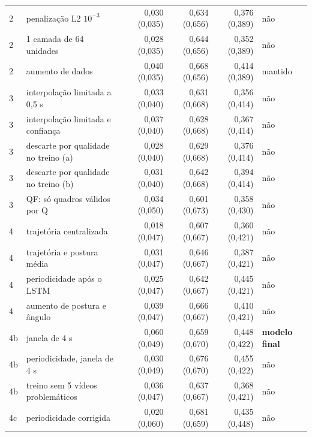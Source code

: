 \begin{table}[htbp]
\begin{tabular}{llrrrl}
2 & penalização L2 $10^{-3}$ & 0,030 (0,035) & 0,634 (0,656) & 0,376 (0,389) & não \\
2 & 1 camada de 64 unidades & 0,028 (0,035) & 0,644 (0,656) & 0,352 (0,389) & não \\
2 & aumento de dados & 0,040 (0,035) & 0,668 (0,656) & 0,414 (0,389) & mantido \\
\midrule
3 & interpolação limitada a 0,5 s & 0,033 (0,040) & 0,631 (0,668) & 0,356 (0,414) & não \\
3 & interpolação limitada e confiança & 0,037 (0,040) & 0,628 (0,668) & 0,367 (0,414) & não \\
3 & descarte por qualidade no treino (a) & 0,028 (0,040) & 0,629 (0,668) & 0,376 (0,414) & não \\
3 & descarte por qualidade no treino (b) & 0,031 (0,040) & 0,642 (0,668) & 0,394 (0,414) & não \\
3 & QF: só quadros válidos por Q & 0,034 (0,050) & 0,601 (0,673) & 0,358 (0,430) & não \\
\midrule
4 & trajetória centralizada & 0,018 (0,047) & 0,607 (0,667) & 0,360 (0,421) & não \\
4 & trajetória e postura média & 0,031 (0,047) & 0,646 (0,667) & 0,387 (0,421) & não \\
4 & periodicidade após o LSTM & 0,025 (0,047) & 0,642 (0,667) & 0,445 (0,421) & não \\
4 & aumento de postura e ângulo & 0,039 (0,047) & 0,666 (0,667) & 0,410 (0,421) & não \\
4b & janela de 4 s & 0,060 (0,049) & 0,659 (0,670) & 0,448 (0,422) & \textbf{modelo final} \\
4b & periodicidade, janela de 4 s & 0,030 (0,049) & 0,676 (0,670) & 0,455 (0,422) & não \\
4b & treino sem 5 vídeos problemáticos & 0,036 (0,047) & 0,637 (0,667) & 0,368 (0,421) & não \\
4c & periodicidade corrigida & 0,020 (0,060) & 0,681 (0,659) & 0,435 (0,448) & não \\
\bottomrule
\end{tabular}
\end{table}
